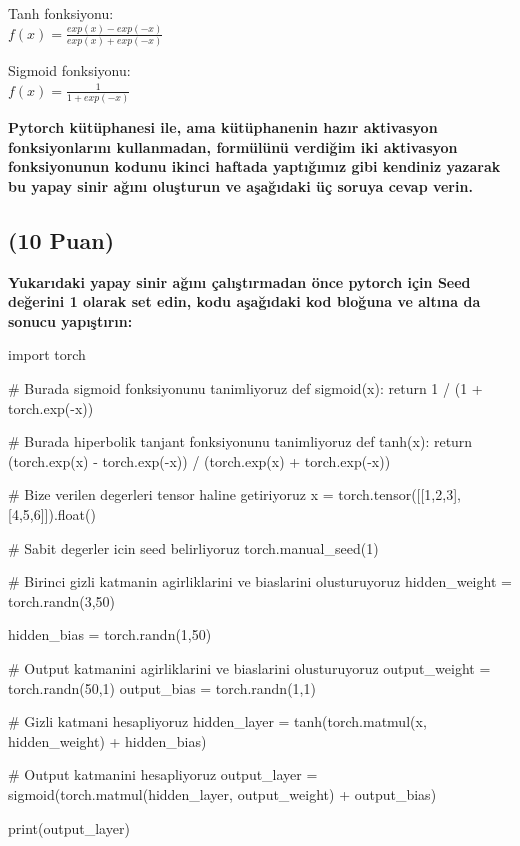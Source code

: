 \documentclass[11pt]{article}
\begin{document}
Tanh fonksiyonu:\\
$f(x) = \frac{exp(x) - exp(-x)}{exp(x) + exp(-x)}$
\vspace{.2in}

Sigmoid fonksiyonu:\\
$f(x) = \frac{1}{1 + exp(-x)}$

\vspace{.2in}
 \textbf{Pytorch kütüphanesi ile, ama kütüphanenin hazır aktivasyon fonksiyonlarını kullanmadan, formülünü verdiğim iki aktivasyon fonksiyonunun kodunu ikinci haftada yaptığımız gibi kendiniz yazarak bu yapay sinir ağını oluşturun ve aşağıdaki üç soruya cevap verin.}
 
\subsection{(10 Puan)} \textbf{Yukarıdaki yapay sinir ağını çalıştırmadan önce pytorch için Seed değerini 1 olarak set edin, kodu aşağıdaki kod bloğuna ve altına da sonucu yapıştırın:}

\begin{python}
import torch

# Burada sigmoid fonksiyonunu tanimliyoruz
def sigmoid(x):
    return 1 / (1 + torch.exp(-x))

# Burada hiperbolik tanjant fonksiyonunu tanimliyoruz
def tanh(x):
    return (torch.exp(x) - torch.exp(-x)) / (torch.exp(x) + torch.exp(-x))    

# Bize verilen degerleri tensor haline getiriyoruz
x = torch.tensor([[1,2,3],[4,5,6]]).float()

# Sabit degerler icin seed belirliyoruz
torch.manual_seed(1)

# Birinci gizli katmanin agirliklarini ve biaslarini olusturuyoruz
hidden_weight = torch.randn(3,50)

hidden_bias = torch.randn(1,50)

# Output katmanini agirliklarini ve biaslarini olusturuyoruz
output_weight = torch.randn(50,1)
output_bias = torch.randn(1,1)

# Gizli katmani hesapliyoruz
hidden_layer = tanh(torch.matmul(x, hidden_weight) + hidden_bias)

# Output katmanini hesapliyoruz
output_layer = sigmoid(torch.matmul(hidden_layer, output_weight) + output_bias)

print(output_layer)

\end{python}
\end{document}
